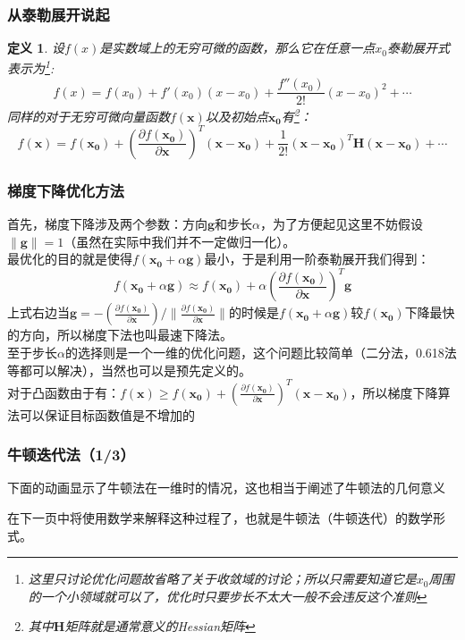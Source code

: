 \documentclass{beamer}
\newtheorem{defn}[thm]{定义}
\begin{document}
\begin{frame}\frametitle{从泰勒展开说起}
\label{Taylor_Externtion}
\begin{defn}
设$f(x)$是实数域上的无穷可微的函数，那么它在任意一点$x_0$泰勒展开式表示为\footnote{这里只讨论优化问题故省略了关于收敛域的讨论；所以只需要知道它是$x_0$周围的一个小领域就可以了，优化时只要步长不太大一般不会违反这个准则}:
\begin{equation}
\label{Taylor_Extention_1}
f(x)=f(x_0)+f'(x_0)(x-x_0)+\frac{f''(x_0)}{2!}(x-x_0)^2+\cdots
\end{equation}
同样的对于无穷可微向量函数$f(\bm{x})$以及初始点$\bm{x_0}$有\footnote{其中$\bm{H}$矩阵就是通常意义的Hessian矩阵}：
\begin{equation}
\label{Taylor_Extention_d}
f(\bm{x})=f(\bm{x_0})+\left(\frac{\partial f(\bm{x_0})}{\partial \bm{x}}\right)^{T}(\bm{x-x_0})+\frac{1}{2!}(\bm{x-x_0})^{T}\bm{H}(\bm{x-x_0})+\cdots
\end{equation}
\end{defn}
\end{frame}
\begin{frame}\frametitle{梯度下降优化方法}
\label{Gradient_Descend_Method}
首先，梯度下降涉及两个参数：方向$\bm{g}$和步长$\alpha$，为了方便起见这里不妨假设$\|\bm{g}\|=1$（虽然在实际中我们并不一定做归一化）。\\
最优化的目的就是使得$f(\bm{x_0}+\alpha \bm{g})$最小，于是利用一阶泰勒展开我们得到：
\begin{equation}
\label{Gradient_Descend}
f(\bm{x_0}+\alpha \bm{g}) \approx f(\bm{x_0})+\alpha\left(\frac{\partial f(\bm{x_0})}{\partial \bm{x}}\right)^{T}\bm{g}
\end{equation}
上式右边当$\bm{g}=-\left(\frac{\partial f(\bm{x_0})}{\partial \bm{x}}\right)/\|\frac{\partial f(\bm{x_0})}{\partial \bm{x}}\|$的时候是$f(\bm{x_0}+\alpha \bm{g})$较$f(\bm{x_0})$下降最快的方向，所以梯度下法也叫最速下降法。\\
至于步长$\alpha$的选择则是一个一维的优化问题，这个问题比较简单（二分法，0.618法等都可以解决），当然也可以是预先定义的。\\
对于凸函数由于有：$f(\bm{x})\geq f(\bm{x_0})+\left(\frac{\partial f(\bm{x_0})}{\partial \bm{x}}\right)^{T}(\bm{x-x_0})$，所以梯度下降算法可以保证目标函数值是不增加的
\end{frame}
\begin{frame}\frametitle{牛顿迭代法（1/3）}
\label{Newton_Method}
下面的动画显示了牛顿法在一维时的情况，这也相当于阐述了牛顿法的几何意义\\
\vspace{-3mm}
\begin{center}
\end{center}
在下一页中将使用数学来解释这种过程了，也就是牛顿法（牛顿迭代）的数学形式。
\end{frame}
\end{document}
